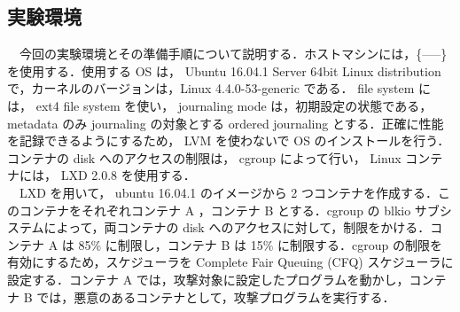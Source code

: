 \documentclass[graduation-thesis]{jsarticle}
\begin{document}
\subsection{実験環境}
　今回の実験環境とその準備手順について説明する．ホストマシンには，\{-----\}を使用する．使用する OS は， Ubuntu 16.04.1 Server 64bit Linux distribution で，カーネルのバージョンは，Linux 4.4.0-53-generic である． file system には， ext4 file system を使い， journaling mode は，初期設定の状態である， metadata のみ journaling の対象とする ordered journaling とする．正確に性能を記録できるようにするため， LVM を使わないで OS のインストールを行う．コンテナの disk へのアクセスの制限は， cgroup によって行い， Linux コンテナには， LXD 2.0.8 を使用する．\\
　LXD を用いて， ubuntu 16.04.1 のイメージから 2 つコンテナを作成する．このコンテナをそれぞれコンテナ A ，コンテナ B とする．cgroup の blkio サブシステムによって，両コンテナの disk へのアクセスに対して，制限をかける．コンテナ A は 85\% に制限し，コンテナ B は 15\% に制限する．cgroup の制限を有効にするため，スケジューラを Complete Fair Queuing (CFQ) スケジューラに設定する．コンテナ A では，攻撃対象に設定したプログラムを動かし，コンテナ B では，悪意のあるコンテナとして，攻撃プログラムを実行する．\\
\end{document}
